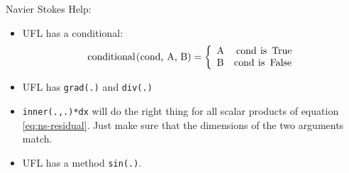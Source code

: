 \documentclass[12pt,a4paper]{article}
\begin{document}
\begin{Exercise}{Navier Stokes}
  Help:
  \begin{itemize}
  \item UFL has a conditional:
    \begin{displaymath}
      \text{\lstinline{conditional(cond, A, B)}} = \left\{
        \begin{array}{lr}
          \text{\lstinline{A}} & \text{\lstinline{cond is True}} \\
          \text{\lstinline{B}} & \text{\lstinline{cond is False}}
        \end{array}
      \right.
    \end{displaymath}
  \item UFL has \lstinline{grad(.)} and \lstinline{div(.)}
  \item \lstinline{inner(.,.)*dx} will do the right thing for all scalar
    products of equation \eqref{eq:ns-residual}. Just make sure that the
    dimensions of the two arguments match.
  \item UFL has a method \lstinline{sin(.)}.
  \end{itemize}
\end{Exercise}
\end{document}
